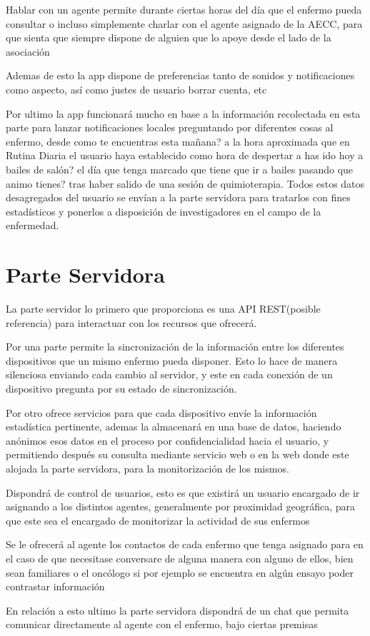 \documentclass[../pfc.tex]{subfiles}
\begin{document}
	Hablar con un agente permite durante ciertas horas del día que el enfermo pueda consultar o incluso simplemente charlar con el agente asignado de la AECC, para que sienta que siempre dispone de alguien que lo apoye desde el lado de la asociación 
	  
	Ademas de esto la app dispone de preferencias tanto de sonidos y notificaciones como aspecto, así como justes de usuario borrar cuenta, etc
	
	Por ultimo la app funcionará mucho en base a la información recolectada en esta parte para lanzar notificaciones locales preguntando por diferentes cosas al enfermo, desde como te encuentras esta mañana? a la hora aproximada que en Rutina Diaria el usuario haya establecido como hora de despertar a has ido hoy a bailes de salón? el día que tenga marcado que tiene que ir a bailes pasando que animo tienes? tras haber salido de una sesión de quimioterapia. Todos estos datos desagregados del usuario se envían a la parte servidora para tratarlos con fines estadísticos y ponerlos a disposición de investigadores en el campo de la enfermedad.
	
	\section{Parte Servidora}
	
	La parte servidor lo primero que proporciona es una API REST(posible referencia) para interactuar con los recursos que ofrecerá.
	
	Por una parte permite la sincronización de la información entre los diferentes dispositivos  que un mismo enfermo pueda disponer. Esto lo hace de manera silenciosa enviando cada cambio al servidor, y este en cada conexión de un dispositivo pregunta por su estado de sincronización.
	
	Por otro ofrece servicios para que cada dispositivo envíe la información estadística pertinente, ademas la almacenará en una base de datos, haciendo anónimos esos datos en el proceso por confidencialidad hacia el usuario, y permitiendo después su consulta mediante servicio web o en la web donde este alojada la parte servidora, para la monitorización de los mismos.
	
	Dispondrá de control de usuarios, esto es que existirá un usuario encargado de ir asignando a los distintos agentes, generalmente por proximidad geográfica, para que este sea el encargado de monitorizar la actividad de sus enfermos 
	
	Se le ofrecerá al agente los contactos de cada enfermo que tenga asignado para en el caso de que necesitase conversare de alguna manera con alguno de ellos, bien sean familiares o el oncólogo si por ejemplo se encuentra en algún ensayo poder contrastar información
	
	En relación a esto ultimo la parte servidora dispondrá de un chat que permita comunicar directamente al agente con el enfermo, bajo ciertas premisas 
	
\end{document}

